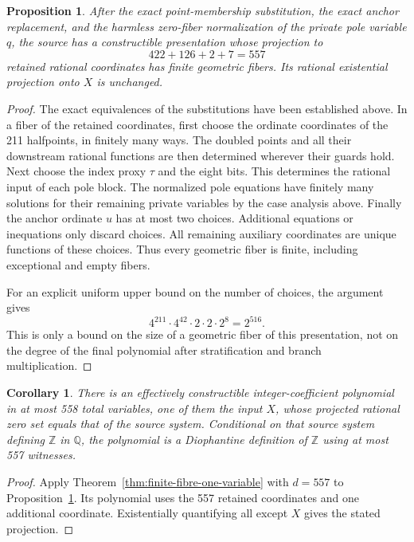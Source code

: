 \documentclass[11pt]{article}
\newtheorem{proposition}[theorem]{Proposition}
\newtheorem{corollary}[theorem]{Corollary}
\theoremstyle{definition}
\begin{document}
\begin{proposition}\label{prop:finite-base-557}
After the exact point-membership substitution, the exact anchor
replacement, and the harmless zero-fiber normalization of the private
pole variable $q$, the source has a constructible presentation whose
projection to
\[
 422+126+2+7=557
\]
retained rational coordinates has finite geometric fibers.
Its rational existential projection onto $X$ is unchanged.
\end{proposition}
\begin{proof}
The exact equivalences of the substitutions have been established
above.  In a fiber of the retained coordinates, first choose the
ordinate coordinates of the 211 halfpoints, in finitely many ways.
The doubled points and all their downstream rational functions are
then determined wherever their guards hold.  Next choose the index
proxy $\tau$ and the eight bits.  This determines the rational input
of each pole block.  The normalized pole equations have finitely many
solutions for their remaining private variables by the case analysis
above.  Finally the anchor ordinate $u$ has at most two choices.
Additional equations or inequations only discard choices.
All remaining auxiliary coordinates are unique functions of these
choices.  Thus every geometric fiber is finite, including exceptional
and empty fibers.

For an explicit uniform upper bound on the number of choices, the
argument gives
\[
 4^{211}\cdot4^{42}\cdot2\cdot2\cdot2^8=2^{516}.
\]
This is only a bound on the size of a geometric fiber of this
presentation, not on the degree of the final polynomial after
stratification and branch multiplication.
\end{proof}

\begin{corollary}\label{cor:558-variables}
There is an effectively constructible integer-coefficient polynomial
in at most 558 total variables, one of them the input $X$, whose
projected rational zero set equals that of the source system.
Conditional on that source system defining $\mathbb Z$ in $\mathbb Q$,
the polynomial is a Diophantine definition of $\mathbb Z$ using at
most 557 witnesses.
\end{corollary}
\begin{proof}
Apply Theorem~\ref{thm:finite-fibre-one-variable} with $d=557$ to
Proposition~\ref{prop:finite-base-557}.  Its polynomial uses the 557
retained coordinates and one additional coordinate.  Existentially
quantifying all except $X$ gives the stated projection.
\end{proof}
\end{document}
